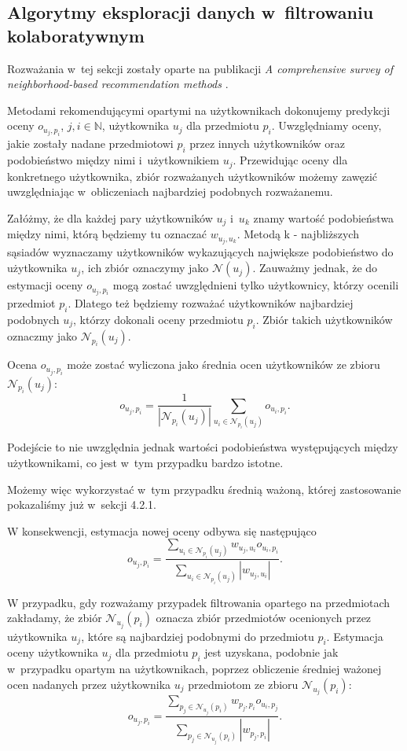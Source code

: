\documentclass[12pt,a4paper]{report}
\newcommand{\setN}{\mathbb{N}}
\begin{document}
\subsection{Algorytmy eksploracji danych w~filtrowaniu kolaboratywnym}
Rozważania w~tej sekcji zostały oparte na publikacji \textit{A comprehensive survey of neighborhood-based recommendation methods} {\citep[Sec 2.1]{acsonbrs}}.

Metodami rekomendującymi opartymi na użytkownikach dokonujemy predykcji oceny $o_{u_j,p_i}$, $ j,i \in \setN$, użytkownika $u_j$ dla przedmiotu $p_i$. Uwzględniamy oceny, jakie zostały nadane przedmiotowi $p_i$ przez innych użytkowników oraz podobieństwo między nimi i~użytkownikiem $u_j$.
Przewidując oceny dla konkretnego użytkownika, zbiór rozważanych użytkowników możemy zawęzić uwzględniając w~obliczeniach najbardziej podobnych rozważanemu. 

Załóżmy, że dla każdej pary użytkowników $u_j$ i~$u_k$ znamy wartość podobieństwa między nimi, którą będziemy tu oznaczać $w_{u_j,u_k}$. Metodą k - najbliższych sąsiadów wyznaczamy użytkowników wykazujących największe podobieństwo do użytkownika $u_j$, ich zbiór oznaczymy jako $\mathcal{N}(u_j)$. Zauważmy jednak, że do estymacji oceny $o_{u_j,p_i}$ mogą zostać uwzględnieni tylko użytkownicy, którzy ocenili przedmiot $p_i$. Dlatego też będziemy rozważać użytkowników najbardziej podobnych $u_j$, którzy dokonali oceny przedmiotu $p_i$. Zbiór takich użytkowników oznaczmy jako $\mathcal{N}_{p_i}(u_j)$.

Ocena $o_{u_j,p_i}$ może zostać wyliczona jako średnia ocen użytkowników ze zbioru $\mathcal{N}_{p_i}(u_j)$:
$$
o_{u_j,p_i} = \frac{1}{|\mathcal{N}_{p_i}(u_j)|} \sum_{u_i \in \mathcal{N}_{p_i}(u_j)} o_{u_i,p_i}.
$$

Podejście to nie uwzględnia jednak wartości podobieństwa występujących między użytkownikami, co jest w~tym przypadku bardzo istotne.

Możemy więc wykorzystać w~tym przypadku średnią ważoną, której zastosowanie pokazaliśmy już w~sekcji 4.2.1.

W konsekwencji, estymacja nowej oceny odbywa się następująco
$$
o_{u_j,p_i} = \frac{\sum_{u_i \in \mathcal{N}_{p_i}(u_j)} w_{u_j,u_i} o_{u_i,p_i}}{\sum_{u_i \in \mathcal{N}_{p_i}(u_j)} |w_{u_j,u_i}|}.
$$

W przypadku, gdy rozważamy przypadek filtrowania opartego na przedmiotach zakładamy, że zbiór $\mathcal{N}_{u_j}(p_i)$ oznacza zbiór przedmiotów ocenionych przez użytkownika $u_j$, które są najbardziej podobnymi do przedmiotu $p_i$. Estymacja oceny użytkownika $u_j$ dla przedmiotu $p_i$ jest uzyskana, podobnie jak w~przypadku opartym na użytkownikach, poprzez obliczenie średniej ważonej ocen nadanych przez użytkownika $u_j$ przedmiotom ze zbioru $\mathcal{N}_{u_j}(p_i)$:
$$
o_{u_j,p_i} = \frac{\sum_{p_j \in \mathcal{N}_{u_j}(p_i)} w_{p_j,p_i} o_{u_i,p_j}}{\sum_{p_j \in \mathcal{N}_{u_j}(p_i)} |w_{p_j,p_i}|}.
$$
\end{document}
